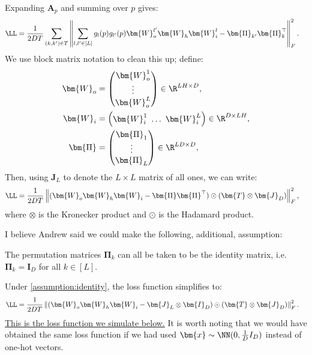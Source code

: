 \documentclass{article}
\begin{document}
Expanding $\bm{A}_p$ and summing over $p$ gives:
\begin{align*}
    \LL
    &= \frac{1}{2DT} \sum_{(k,k') \in T} \left\Vert \sum_{l,l' \in [L]} g_l(p) g_{l'}(p) \bm{W}_o^{l'} \bm{W}_h \bm{W}_i^l - \bm{\Pi}_{k'} \bm{\Pi}_k^\top \right\Vert_F^2.
\end{align*}
We use block matrix notation to clean this up; define:
\begin{align*}
    \bm{W}_o &= \begin{pmatrix} \bm{W}_o^1 \\ \vdots \\ \bm{W}_o^L \end{pmatrix} \in \R^{L H \times D}, \\
    \bm{W}_i &= \begin{pmatrix} \bm{W}_i^1 \ \hdots \ \bm{W}_i^L \end{pmatrix} \in \R^{D \times L H}, \\
    \bm{\Pi} &= \begin{pmatrix} \bm{\Pi}_1 \\ \vdots \\ \bm{\Pi}_L \end{pmatrix} \in \R^{L D \times D}, \\
\end{align*}
Then, using $\bm{J}_L$ to denote the $L \times L$ matrix of all ones, we can write:
\begin{align*}
    \LL
    &= \frac{1}{2DT} \left\Vert ( \bm{W}_o \bm{W}_h \bm{W}_i - \bm{\Pi} \bm{\Pi}^\top ) \odot ( \bm{T} \otimes \bm{J}_D ) \right\Vert_F^2,
\end{align*}
where $\otimes$ is the Kronecker product and $\odot$ is the Hadamard product.

I believe Andrew said we could make the following, additional, assumption:
\begin{assumption} \label{assumption:identity}
    The permutation matrices $\bm{\Pi}_k$ can all be taken to be the identity matrix, i.e. $\bm{\Pi}_k = \bm{I}_D$ for all $k \in [L]$.
\end{assumption}
Under \cref{assumption:identity}, the loss function simplifies to:
\begin{align}
    \LL
    &= \frac{1}{2DT} \left\Vert ( \bm{W}_o \bm{W}_h \bm{W}_i - \bm{J}_L \otimes \bm{I}_D ) \odot ( \bm{T} \otimes \bm{J}_D ) \right\Vert_F^2.
    \label{eq:loss}
\end{align}
\underline{This is the loss function we simulate below.}
It is worth noting that we would have obtained the same loss function if we had used $\bm{x} \sim \NN(0, \frac{1}{D} I_D)$ instead of one-hot vectors.
\end{document}
